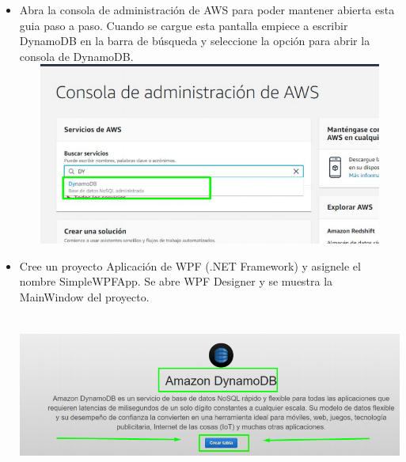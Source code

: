 \documentclass[12pt,a4paper,oneside]{book}
\begin{document}
	\begin{itemize}
		\item {Abra la consola de administración de AWS para poder mantener abierta esta guia paso a paso. Cuando se cargue esta pantalla empiece a escribir DynamoDB en la barra de búsqueda y seleccione la opción para abrir la consola de DynamoDB.
}\\
		
		\includegraphics[width=16cm, height=6cm]{img/1.png}\\
		
		\item {Cree un proyecto Aplicación de WPF (.NET Framework) y asignele el nombre SimpleWPFApp. Se abre WPF Designer y se muestra la MainWindow del proyecto.
}\\
		
		\includegraphics[width=16cm, height=6cm]{img/2.png}\\
	\end{itemize}
\end{document}
